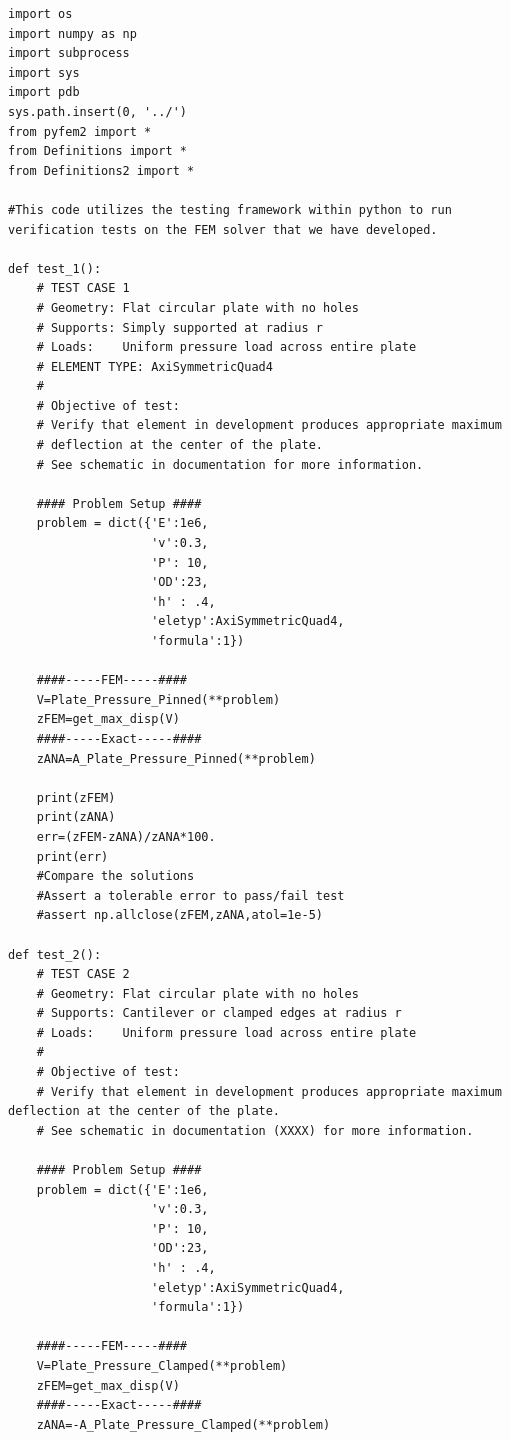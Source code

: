 \documentclass[10pt,letterpaper]{report}
\numberwithin{equation}{chapter}
\begin{document}
\begin{lstlisting}
import os
import numpy as np
import subprocess
import sys
import pdb
sys.path.insert(0, '../')
from pyfem2 import *
from Definitions import *
from Definitions2 import *

#This code utilizes the testing framework within python to run verification tests on the FEM solver that we have developed.

def test_1():
    # TEST CASE 1
    # Geometry: Flat circular plate with no holes
    # Supports: Simply supported at radius r
    # Loads:    Uniform pressure load across entire plate
    # ELEMENT TYPE: AxiSymmetricQuad4
    #
    # Objective of test: 
    # Verify that element in development produces appropriate maximum 
    # deflection at the center of the plate. 
    # See schematic in documentation for more information.
    
    #### Problem Setup ####
    problem = dict({'E':1e6,
                    'v':0.3,
                    'P': 10,
                    'OD':23,
                    'h' : .4,
                    'eletyp':AxiSymmetricQuad4,
                    'formula':1})
    
    ####-----FEM-----####
    V=Plate_Pressure_Pinned(**problem)
    zFEM=get_max_disp(V)
    ####-----Exact-----####
    zANA=A_Plate_Pressure_Pinned(**problem)
    
    print(zFEM)
    print(zANA)
    err=(zFEM-zANA)/zANA*100.
    print(err)
    #Compare the solutions
    #Assert a tolerable error to pass/fail test
    #assert np.allclose(zFEM,zANA,atol=1e-5)

def test_2():
    # TEST CASE 2
    # Geometry: Flat circular plate with no holes
    # Supports: Cantilever or clamped edges at radius r
    # Loads: 	Uniform pressure load across entire plate
    #
    # Objective of test: 
    # Verify that element in development produces appropriate maximum deflection at the center of the plate. 
    # See schematic in documentation (XXXX) for more information.
    
    #### Problem Setup ####
    problem = dict({'E':1e6,
                    'v':0.3,
                    'P': 10,
                    'OD':23,
                    'h' : .4,
                    'eletyp':AxiSymmetricQuad4,
                    'formula':1})
    
    ####-----FEM-----####
    V=Plate_Pressure_Clamped(**problem)
    zFEM=get_max_disp(V)
    ####-----Exact-----####
    zANA=-A_Plate_Pressure_Clamped(**problem)
    

\end{lstlisting}
\end{document}
